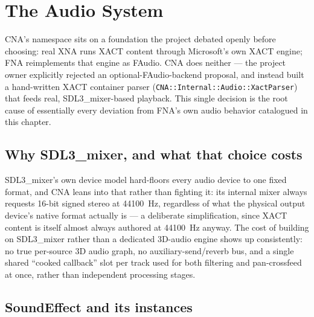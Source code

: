 \chapter{The Audio System}
\label{ch:audio-system}

CNA's  namespace sits on a foundation the project
debated openly before choosing: real XNA runs XACT content through Microsoft's own XACT
engine; FNA reimplements that engine as FAudio. CNA does neither --- the project owner
explicitly rejected an optional-FAudio-backend proposal, and instead built a hand-written
XACT container parser (\texttt{CNA::Internal::Audio::XactParser}) that feeds real,
SDL3\_mixer-based playback. This single decision is the root cause of essentially every
deviation from FNA's own audio behavior catalogued in this chapter.

\section{Why SDL3\_mixer, and what that choice costs}

SDL3\_mixer's own device model hard-floors every audio device to one fixed format, and CNA
leans into that rather than fighting it: its internal mixer always requests 16-bit signed
stereo at 44100~Hz, regardless of what the physical output device's native format actually
is --- a deliberate simplification, since XACT content is itself almost always authored at
44100~Hz anyway. The cost of building on SDL3\_mixer rather than a dedicated 3D-audio engine
shows up consistently: no true per-source 3D audio graph, no auxiliary-send/reverb bus, and a
single shared ``cooked callback'' slot per track used for both filtering and pan-crossfeed at
once, rather than independent processing stages.

\section{SoundEffect and its instances}

